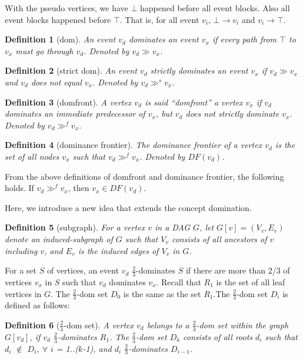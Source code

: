 \documentclass{article}
\newtheorem{defn}{Definition}[section]
\newcommand{\dom}{\gg}
\newcommand{\sdom}{\gg^{s}}
\newcommand{\domf}{\gg^{f}}
\newcommand{\hbefore}{\rightarrow}
\begin{document}
With the pseudo vertices, we have $\bot$ happened before all event blocks. Also all event blocks happened before $\top$. That is, for all event $v_i$, $\bot \hbefore v_i$ and $v_i \hbefore \top$.

\begin{defn}[dom]
	An event $v_d$ dominates an event $v_x$ if every path from $\top$ to $v_x$ must go through $v_d$. Denoted by $v_d \dom v_x$.
\end{defn}

\begin{defn}[strict dom]
	An event $v_d$ strictly dominates an event $v_x$ if $v_d \dom v_x$ and $v_d$ does not equal $v_x$. Denoted by $v_d \sdom v_x$.
\end{defn}


\begin{defn}[domfront]
	A vertex $v_d$ is said ``domfront'' a vertex $v_x$ if  $v_d$ dominates an immediate predecessor of $v_x$, but $v_d$ does not strictly dominate $v_x$. Denoted by $v_d \domf v_x$.
\end{defn}

\begin{defn}[dominance frontier]
	The dominance frontier of a vertex $v_d$ is the set of all nodes $v_x$ such that $v_d \domf v_x$. Denoted by $DF(v_d)$.
\end{defn}

From the above definitions of domfront and dominance frontier, the following holds. If $v_d \domf v_x$, then $v_x \in DF(v_d)$.


Here, we introduce a new idea that extends the concept domination.

\begin{defn}[subgraph] 
	For a vertex $v$ in a DAG $G$, let $G[v] = (V_v,E_v)$ denote an induced-subgraph of $G$ such that $V_v$ consists of all ancestors of $v$ including $v$, and $E_v$ is the induced edges of $V_v$ in $G$.
\end{defn}



For a set $S$ of vertices, an event $v_d$  $\frac{2}{3}$-dominates $S$ if there are more than 2/3 of vertices $v_x$ in $S$ such that $v_d$ dominates $v_x$. 	
Recall that $R_1$ is the set of all leaf vertices in $G$. The $\frac{2}{3}$-dom set $D_0$ is the same as the set $R_1$.The $\frac{2}{3}$-dom set $D_i$ is defined as follows:	
\begin{defn}[$\frac{2}{3}$-dom set]	
	A vertex $v_d$ belongs to a $\frac{2}{3}$-dom set  within the graph $G[v_d]$, if $v_d$ $\frac{2}{3}$-dominates $R_1$.
	The $\frac{2}{3}$-dom set $D_k$ consists of all roots $d_i$ such that  $d_i$ $\not \in $ $D_i$, $\forall$ $i$ = 1..($k$-1), and $d_i$ $\frac{2}{3}$-dominates $D_{i-1}$.
\end{defn}
\end{document}

